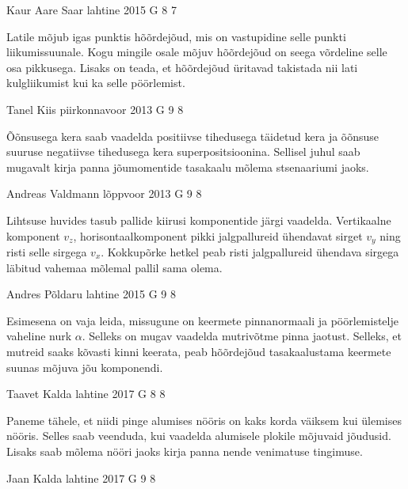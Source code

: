 \documentclass[11pt, twoside]{article}
\begin{document}
{%
{Kaur Aare Saar} %
{lahtine} %
{2015} %
{G 8} %
{7} %
{

\ifHint
Latile mõjub igas punktis hõõrdejõud, mis on vastupidine selle punkti liikumissuunale. Kogu mingile osale mõjuv hõõrdejõud on seega võrdeline selle osa pikkusega. Lisaks on teada, et hõõrdejõud üritavad takistada nii lati kulgliikumist kui ka selle pöörlemist.
\fi
}

{Tanel Kiis} %
{piirkonnavoor} %
{2013} %
{G 9} %
{8} %
{

\ifHint
Õõnsusega kera saab vaadelda positiivse tihedusega täidetud kera ja õõnsuse suuruse negatiivse tihedusega kera superpositsioonina. Sellisel juhul saab mugavalt kirja panna jõumomentide tasakaalu mõlema stsenaariumi jaoks.
\fi
}

{Andreas Valdmann} %
{lõppvoor} %
{2013} %
{G 9} %
{8} %
{

\ifHint
Lihtsuse huvides tasub pallide kiirusi komponentide järgi vaadelda. Vertikaalne komponent $v_z$, horisontaalkomponent pikki jalgpallureid ühendavat sirget $v_y$ ning risti selle sirgega $v_x$. Kokkupõrke hetkel peab risti jalgpallureid ühendava sirgega läbitud vahemaa mõlemal pallil sama olema.
\fi
}

{Andres Põldaru} %
{lahtine} %
{2015} %
{G 9} %
{8} %
{

\ifHint
Esimesena on vaja leida, missugune on keermete pinnanormaali ja pöörlemistelje vaheline nurk $\alpha$. Selleks on mugav vaadelda mutrivõtme pinna jaotust. Selleks, et mutreid saaks kõvasti kinni keerata, peab hõõrdejõud tasakaalustama keermete suunas mõjuva jõu komponendi.
\fi
}

{Taavet Kalda} %
{lahtine} %
{2017} %
{G 8} %
{8} %
{

\ifHint
Paneme tähele, et niidi pinge alumises nööris on kaks korda väiksem kui ülemises nööris. Selles saab veenduda, kui vaadelda alumisele plokile mõjuvaid jõudusid. Lisaks saab mõlema nööri jaoks kirja panna nende venimatuse tingimuse.
\fi
}

{Jaan Kalda} %
{lahtine} %
{2017} %
{G 9} %
{8} %
{

}}
\end{document}
